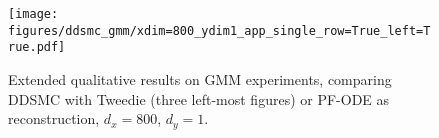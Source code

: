 \begin{figure*}[tb!]
\texttt{[image: figures/ddsmc\_gmm/xdim=800\_ydim1\_app\_single\_row=True\_left=True.pdf]}
\caption{\label{fig:gmm_ddsmc_appendix_800} Extended qualitative results on GMM experiments, comparing DDSMC with Tweedie (three left-most figures) or PF-ODE as reconstruction, $d_x=800$, $d_y=1$.}
\end{figure*}
